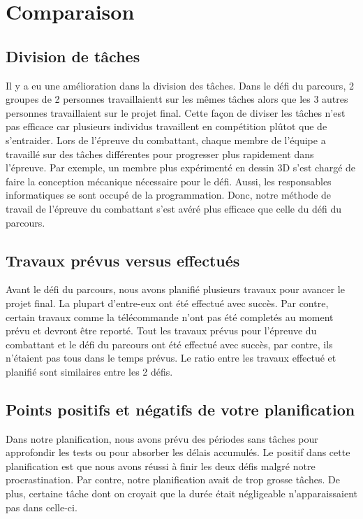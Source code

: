 \section{Comparaison}

\subsection{Division de tâches}

\begin{spacing}{1.5}
    Il y a eu une amélioration dans la division des tâches. Dans le défi du parcours, 2 groupes de 2 personnes travaillaientt sur les mêmes tâches alors que les 3 autres personnes travaillaient sur le projet final. Cette façon de diviser les tâches n'est pas efficace car plusieurs individus travaillent en compétition plûtot que de s'entraider. Lors de l'épreuve du combattant, chaque membre de l'équipe a travaillé sur des tâches différentes pour progresser plus rapidement dans l'épreuve. Par exemple, un membre plus expérimenté en dessin 3D s'est chargé de faire la conception mécanique nécessaire pour le défi. Aussi, les responsables informatiques se sont occupé de la programmation.  Donc, notre méthode de travail de l'épreuve du combattant s'est avéré plus efficace que celle du défi du parcours.
\end{spacing}

\subsection{Travaux prévus versus effectués}

\begin{spacing}{1.5}
    Avant le défi du parcours, nous avons planifié plusieurs travaux pour avancer le projet final. La plupart d'entre-eux ont été effectué avec succès. Par contre, certain travaux comme la télécommande n'ont pas été completés au moment prévu et devront être reporté. Tout les travaux prévus pour l'épreuve du combattant et le défi du parcours ont été effectué avec succès, par contre, ils n'étaient pas tous dans le temps prévus. Le ratio entre les travaux effectué et planifié sont similaires entre les 2 défis.
\end{spacing}

\subsection{Points positifs et négatifs de votre planification}

\begin{spacing}{1.5}
    Dans notre planification, nous avons prévu des périodes sans tâches pour approfondir les tests ou pour absorber les délais accumulés. Le positif dans cette planification est que nous avons réussi à finir les deux défis malgré notre procrastination. Par contre, notre planification avait de trop grosse tâches. De plus, certaine tâche dont on croyait que la durée était négligeable n'apparaissaient pas dans celle-ci.
\end{spacing}

